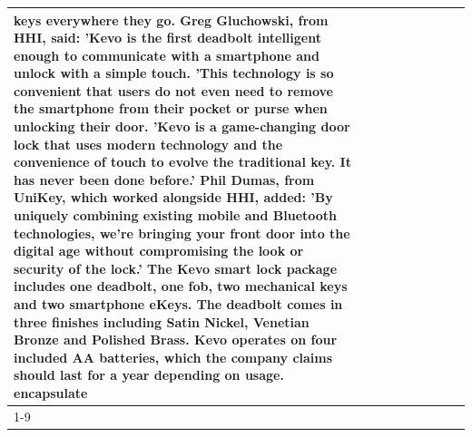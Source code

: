 \begin{table}[H]
\begin{tabular}{lllrlllll}
keys everywhere they go. Greg Gluchowski, from HHI, said: 'Kevo is the first deadbolt intelligent enough to communicate with a smartphone and unlock with a simple touch. 'This technology is so convenient that users do not even need to remove the smartphone from their pocket or purse when unlocking their door. 'Kevo is a game-changing door lock that uses modern technology and the convenience of touch to evolve the traditional key. It has never been done before.' Phil Dumas, from UniKey, which worked alongside HHI, added: 'By uniquely combining existing mobile and Bluetooth technologies, we’re bringing your front door into the digital age without compromising the look or security of the lock.' The Kevo smart lock package includes one deadbolt, one fob, two mechanical keys and two smartphone eKeys. The deadbolt comes in three finishes including Satin Nickel, Venetian Bronze and Polished Brass. Kevo operates on four included AA batteries, which the company claims should last for a year depending on usage. encapsulate \\
\cline{1-9}

\end{tabular}
\end{table}

